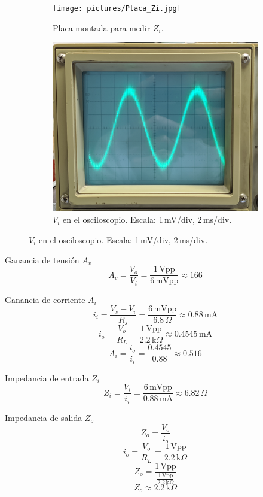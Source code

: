 \begin{frame}{}
  \noindent
  \begin{figure}[!ht]
  \centering
  \begin{subfigure}[t]{0.49\linewidth}
    \centering
    \texttt{[image: pictures/Placa\_Zi.jpg]}
    \caption{Placa montada para medir $Z_i$.}
  \end{subfigure}
  \hfill
  \begin{subfigure}[t]{0.49\linewidth}
    \centering
    \includegraphics[height=0.45\textheight]{pictures/Medicion Vi.jpg}
    \caption{$V_i$ en el osciloscopio. Escala: 1\,mV/div, 2\,ms/div.}
  \end{subfigure}
\end{figure}
\end{frame}


\begin{frame}{}

\begin{block}{Ganancia de tensión $A_v$}
\[
A_v = \frac{V_o}{V_i} = \frac{1\,\text{Vpp}}{6\,\text{mVpp}} \approx 166
\]
\end{block}

\begin{block}{Ganancia de corriente $A_i$}
\[
i_i = \frac{V_s - V_i}{R_s} = \frac{6\,\text{mVpp}}{6.8\,\Omega} \approx 0.88\,\text{mA}
\]
\[
i_o = \frac{V_o}{R_L} = \frac{1\,\text{Vpp}}{2.2\,\text{k}\Omega} \approx 0.4545\,\text{mA}
\]
\[
A_i = \frac{i_o}{i_i} = \frac{0.4545}{0.88} \approx 0.516
\]
\end{block}

\begin{block}{Impedancia de entrada $Z_i$}
\[
Z_i = \frac{V_i}{i_i} = \frac{6\,\text{mVpp}}{0.88\,\text{mA}} \approx 6.82\,\Omega
\]
\end{block}

\end{frame}



\begin{frame}{}

\begin{block}{Impedancia de salida $Z_o$}
\[
Z_o = \frac{V_o}{i_o}
\]
\[
i_o = \frac{V_o}{R_L} = \frac{1\,\text{Vpp}}{2.2\,\text{k}\Omega}
\]
\[
Z_o = \frac{1\,\text{Vpp}}{\tfrac{1\,\text{Vpp}}{2.2\,\text{k}\Omega}}
\]
\[
Z_o \approx 2.2\,\text{k}\Omega
\]
\end{block}

\end{frame}
